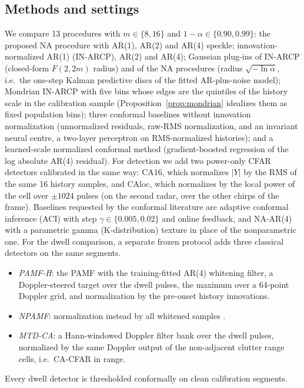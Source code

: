 \documentclass[journal]{IEEEtran}
\begin{document}
\subsection{Methods and settings}
We compare 13 procedures with $m\in\{8,16\}$ and $1-\alpha\in\{0.90,0.99\}$: the proposed NA procedure with AR(1), AR(2) and AR(4) speckle; innovation-normalized AR(1) (IN-ARCP), AR(2) and AR(4); Gaussian plug-ins of IN-ARCP (closed-form $F(2,2m)$ radius) and of the NA procedures (radius $\sqrt{-\ln\alpha}$, i.e.\ the one-step Kalman predictive discs of the fitted AR-plus-noise model); Mondrian IN-ARCP with five bins whose edges are the quintiles of the history scale in the calibration sample (Proposition~\ref{prop:mondrian} idealizes them as fixed population bins); three conformal baselines without innovation normalization (unnormalized residuals, raw-RMS normalization, and an invariant neural centre, a two-layer perceptron on RMS-normalized histories); and a learned-scale normalized conformal method (gradient-boosted regression of the log absolute AR(4) residual). For detection we add two power-only CFAR detectors calibrated in the same way: CA16, which normalizes $|Y|$ by the RMS of the same 16 history samples, and CAloc, which normalizes by the local power of the cell over $\pm1024$ pulses (on the second radar, over the other chirps of the frame). Baselines requested by the conformal literature are adaptive conformal inference (ACI) \cite{gibbs2021aci} with step $\gamma\in\{0.005,0.02\}$ and online feedback, and NA-AR(4) with a parametric gamma (K-distribution) texture in place of the nonparametric one. For the dwell comparison, a separate frozen protocol adds three classical detectors on the same segments.
\begin{itemize}[leftmargin=*,itemsep=1pt]
\item \emph{PAMF-H}: the PAMF \cite{roman2000} with the training-fitted AR(4) whitening filter, a Doppler-steered target over the dwell pulses, the maximum over a 64-point Doppler grid, and normalization by the pre-onset history innovations.
\item \emph{NPAMF}: normalization instead by all whitened samples \cite{michels2000}.
\item \emph{MTD-CA}: a Hann-windowed Doppler filter bank over the dwell pulses, normalized by the same Doppler output of the non-adjacent clutter range cells, i.e.\ CA-CFAR in range.
\end{itemize}
Every dwell detector is thresholded conformally on clean calibration segments.
\end{document}

